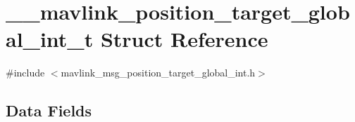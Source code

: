 \hypertarget{struct____mavlink__position__target__global__int__t}{\section{\+\_\+\+\_\+mavlink\+\_\+position\+\_\+target\+\_\+global\+\_\+int\+\_\+t Struct Reference}
\label{struct____mavlink__position__target__global__int__t}
}


{\ttfamily \#include $<$mavlink\+\_\+msg\+\_\+position\+\_\+target\+\_\+global\+\_\+int.\+h$>$}

\subsection*{Data Fields}
